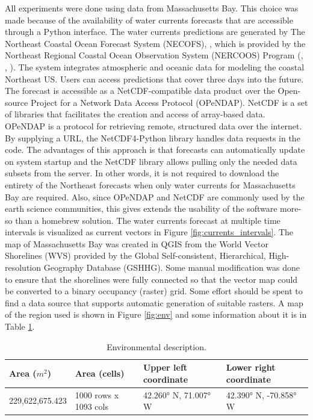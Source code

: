 \documentclass{tamuccthesis}
\begin{document}
All experiments were done using data from Massachusetts Bay. This choice was made because of the availability of water currents forecasts that are accessible through a Python interface. The water currents predictions are generated by The Northeast Coastal Ocean Forecast System (NECOFS), \cite{NECOFS}, which is provided by the Northeast Regional Coastal Ocean Observation System (NERCOOS) Program (\cite{NERACOOS}, \cite{MFI}, \cite{MIT:sea}). The system integrates atmospheric and oceanic data for modeling the coastal Northeast US. Users can access predictions that cover three days into the future. The forecast is accessible as a NetCDF-compatible data product over the Open-source Project for a Network Data Access Protocol (OPeNDAP). NetCDF is a set of libraries that facilitates the creation and access of array-based data. OPeNDAP is a protocol for retrieving remote, structured data over the internet. By supplying a URL, the NetCDF4-Python library handles data requests in the code. The advantages of this approach is that forecasts can automatically update on system startup and the NetCDF library allows pulling only the needed data subsets from the server. In other words, it is not required to download the entirety of the Northeast forecasts when only water currents for Massachusetts Bay are required. Also, since OPeNDAP and NetCDF are commonly used by the earth science communities, this gives extends the usability of the software more-so than a homebrew solution. The water currents forecast at multiple time intervals is visualized as current vectors in Figure \ref{fig:currents_intervals}. The map of Massachusetts Bay was created in QGIS from the World Vector Shorelines (WVS) provided by the Global Self-consistent, Hierarchical, High-resolution Geography Database (GSHHG). Some manual modification was done to ensure that the shorelines were fully connected so that the vector map could be converted to a binary occupancy (raster) grid. Some effort should be spent to find a data source that supports automatic generation of suitable rasters. A map of the region used is shown in Figure \ref{fig:env} and some information about it is in Table \ref{tbl:env_desc}.

\begin{table}[H]\small
    \begin{tabular}{|l|l|l|l|}
\hline
Area ($m^2$) & Area (cells) & Upper left coordinate & Lower right coordinate \\
\hline
229,622,675.423 & 1000 rows x 1093 cols  &  42.260° N, 71.007° W & 42.390° N, -70.858° W \\
\hline
    \end{tabular}
    \caption[Environmental description.]{Environmental description.}
    \label{tbl:env_desc}
\end{table}
\end{document}
